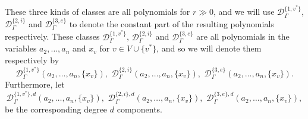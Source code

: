 \documentclass[12pt,reqno]{amsart}
\theoremstyle{plain}
\theoremstyle{definition}
\theoremstyle{remark}
\begin{document}
These three kinds of  classes are all polynomials for $r \gg 0$, and we will use
$\mathcal{D}_{\Gamma}^{\{1,v^*\}}$, $\mathcal{D}_{\Gamma}^{\{2,i\}}$ and $\mathcal{D}_{\Gamma}^{\{3,e\}}$  to denote the constant part of the resulting
polynomials respectively.
These classes $\mathcal{D}^{\{1,v^*\}}_{\Gamma}$, $\mathcal{D}^{\{2,i\}}_{\Gamma}$ and $\mathcal{D}^{\{3,e\}}_{\Gamma}$ are all polynomials in the variables
$a_2, \dotsc, a_n$ and $x_v$ for $v \in V\cup\{v^*\}$, and so we will
denote them respectively by
\begin{equation*}
  \mathcal{D}^{\{1,v^*\}}_{\Gamma}(a_2, \dotsc, a_n, \{x_v\}),\,\, \mathcal{D}^{\{2,i\}}_{\Gamma}(a_2, \dotsc, a_n, \{x_v\}),\,\, \mathcal{D}^{\{3,e\}}_{\Gamma}(a_2, \dotsc, a_n, \{x_v\}).
\end{equation*}
Furthermore, let
\begin{equation*}
  \mathcal{D}^{\{1,v^*\}, d}_{\Gamma}(a_2, \dotsc, a_n, \{x_v\}),\,\, \mathcal{D}^{\{2,i\}, d}_{\Gamma}(a_2, \dotsc, a_n, \{x_v\}),\,\, \mathcal{D}^{\{3,e\}, d}_{\Gamma}(a_2, \dotsc, a_n, \{x_v\}),
\end{equation*}
be the corresponding degree $d$ components.


\end{document}
